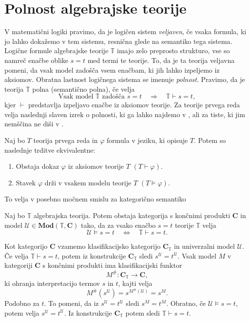 \documentclass[../kategoricna_logika.tex]{subfiles}
\begin{document}
\section{Polnost algebrajske teorije}
V matematični logiki pravimo, da je logičen sistem \emph{veljaven},
če vsaka formula, ki jo lahko dokažemo v tem sistemu, resnična
glede na semantiko tega sistema. Logične formule algebrajske teorije
$\mathbb{T}$ imajo zelo preprosto strukturo, vse so namreč enačbe
oblike $s = t$ med termi te teorije. To, da je ta teorija veljavna
pomeni, da vsak model zadošča vsem enačbam, ki jih lahko izpeljemo
iz aksiomov. Obratna lastnost logičnega sistema se imenuje \emph{polnost}.
Pravimo, da je teorija $\mathbb{T}$ polna (semantično polna), če velja
$$\text{Vsak model } \mathbb{T} \text{ zadošča }s=t \quad \Longrightarrow
  \quad \mathbb{T} \vdash s = t,$$
kjer $\vdash$ predstavlja izpeljavo enačbe iz aksiomov teorije.
Za teorije prvega reda velja naslednji slaven izrek o polnosti, ki
ga lahko najdemo v \cite{godel-completeness}, ali za tiste, ki jim nemščina ne diši
v \cite{prijatelj1992osnove2}.
\begin{izrek}[Gödel]
  Naj bo $T$ teorija prvega reda in $\varphi$ formula v jeziku, ki
  opisuje $T$. Potem so naslednje trditve ekvivalentne:
  \begin{enumerate}
  \item Obstaja dokaz $\varphi$ iz aksiomov teorije $T$
    $(T \vdash \varphi)$.
  \item Stavek $\varphi$ drži v vsakem modelu teorije $T$
    $(T \models \varphi)$.
  \end{enumerate}
\end{izrek}
To velja v posebno močnem smislu za kategorično semantiko
\begin{izrek}
  Naj bo $\mathbb{T}$ algebrajska teorija. Potem obstaja kategorija s
  končnimi produkti $\mathbf{C}$ in model
  $\mathcal{U} \in \mathbf{Mod}(\mathbb{T}, \mathbf{C})$ tako, da za vsako
  enačbo $s = t$ teorije $\mathbb{T}$ velja
$$\mathcal{U} \models s = t \quad \Longleftrightarrow \quad \mathbb{T} \vdash s = t.$$
\end{izrek}
\begin{dokaz}
  Kot kategorijo $\mathbf{C}$ vzamemo klasifikacijsko kategorijo
  $\mathbf{C}_\mathbb{T}$ in univerzalni model $\mathcal{U}$. Če
  velja $\mathbb{T} \vdash s = t$, potem iz konstrukcije
  $\mathbf{C}_\mathbb{T}$ sledi $s^\mathcal{U} =
  t^\mathcal{U}$. Vsak model $M$ v kategoriji $\mathbf{C}$
  s končnimi produkti ima klasifikacijski funktor
  \[  M^{\#} : \mathbf{C}_{\mathbb{T}} \to \mathbf{C}, \]
  ki ohranja interpretacijo termov $s$ in $t$, kajti velja
  \[ M^{\#}(s^\mathcal{U}) = s^{M^{\#}(\mathcal{U})} = s^M. \]
  Podobno za $t$.
  To pomeni, da iz $s^{\mathcal{U}} = t^{\mathcal{U}}$ sledi $s^M = t^M$.
  Obratno, če ${\mathcal{U} \models s = t}$, potem velja $s^{\mathcal{U}} = t^{\mathcal{U}}$.
  Iz konstrukcije $\mathbf{C}_{\mathbb{T}}$ potem sledi ${\mathbb{T} \vdash s = t}$.
\end{dokaz}
\end{document}
